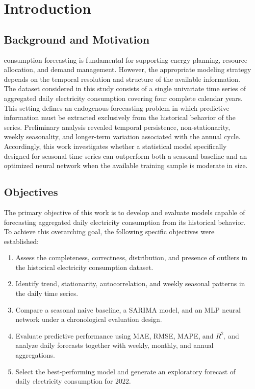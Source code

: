\documentclass{ieeeaccess}
\begin{document}
\section{Introduction}
\label{sec:introduction}
\subsection{Background and Motivation}
 consumption forecasting is fundamental for supporting energy planning, resource allocation, and demand management. However, the appropriate modeling strategy depends on the temporal resolution and structure of the available information. The dataset considered in this study consists of a single univariate time series of aggregated daily electricity consumption covering four complete calendar years. This setting defines an endogenous forecasting problem in which predictive information must be extracted exclusively from the historical behavior of the series. Preliminary analysis revealed temporal persistence, non-stationarity, weekly seasonality, and longer-term variation associated with the annual cycle. Accordingly, this work investigates whether a statistical model specifically designed for seasonal time series can outperform both a seasonal baseline and an optimized neural network when the available training sample is moderate in size.

\subsection{Objectives}
The primary objective of this work is to develop and evaluate models capable of forecasting aggregated daily electricity consumption from its historical behavior. To achieve this overarching goal, the following specific objectives were established:
\begin{enumerate}
\item Assess the completeness, correctness, distribution, and presence of outliers in the historical electricity consumption dataset.
\item Identify trend, stationarity, autocorrelation, and weekly seasonal patterns in the daily time series.
\item Compare a seasonal naive baseline, a SARIMA model, and an MLP neural network under a chronological evaluation design.
\item Evaluate predictive performance using MAE, RMSE, MAPE, and $R^2$, and analyze daily forecasts together with weekly, monthly, and annual aggregations.
\item Select the best-performing model and generate an exploratory forecast of daily electricity consumption for 2022.
\end{enumerate}
\end{document}

